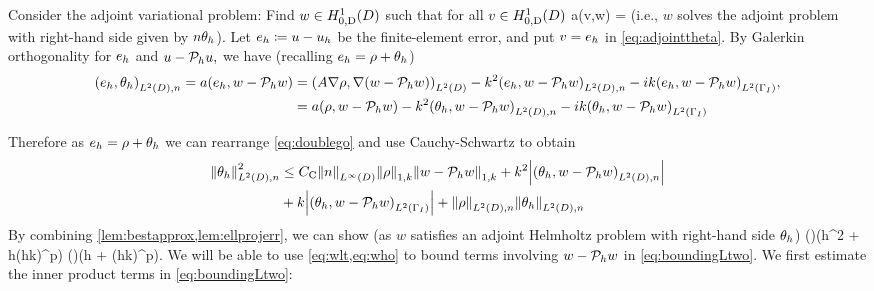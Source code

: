 Consider the adjoint variational problem: Find $w \in \HozDD$ such that for all $v \in \HozDD$
\beq\label{eq:adjointtheta}
a(v,w) = 
\eeq
(i.e., $w$ solves the adjoint problem with right-hand side given by $n\theta_{h}$). Let $e_{h} \coloneqq u -u_{h}$ be the finite-element error, and put $v = e_{h}$ in \cref{eq:adjointtheta}. By Galerkin orthogonality for $e_{h}$ and $u-\mathcal P_{h} u,$ we have (recalling $e_{h} = \rho + \theta_{h}$)
\begin{align}
\IPLtDn{\eh}{\thetah} = a(\eh,w-\Ph w) &= \IPLtD{A \grad \rho}{\grad(w-\Ph w)}  -k^2 \IPLtDn{\eh}{w-\Ph w} -ik \IPLtGI{\eh}{w-\Ph w},\nonumber\\
&=a(\rho,w-\Ph w) -k^2 \IPLtDn{\thetah}{w-\Ph w} -ik \IPLtGI{\thetah}{w-\Ph w}\label{eq:doublego}
\end{align}

Therefore as $e_{h} = \rho + \theta_{h}$ we can rearrange \cref{eq:doublego} and use Cauchy-Schwartz to obtain
\begin{align}
\NLtDn{\thetah}^2 &\leq \Cc\NLiD{n} \NW{\rho} \NW{w- \Ph w} + k^2 \abs{\IPLtDn{\thetah}{w- \Ph w}}\nonumber\\
&+ k \abs{\IPLtGI{\thetah}{w-\Ph w}} + \NLtDn{\rho}\NLtDn{\thetah}\label{eq:boundingLtwo}
\end{align}
By combining \cref{lem:bestapprox,lem:ellprojerr}, we can show (as $w$ satisfies an adjoint Helmholtz problem with right-hand side $\theta_{h}$)
\beq\label{eq:wlt}
 \leq {} \mleft(\mright)\mleft(\CFEMotilde h^2 + \CFEMttilde \CAnk h(hk)^p\mright)\NLtD{\thetah} \tand
\eeq
\beq\label{eq:who}
  \mleft(\mright)\mleft(\CFEMotilde h + \CFEMttilde \CAnk (hk)^p\mright)\NLtD{\thetah}.
\eeq
We will be able to use \cref{eq:wlt,eq:who} to bound terms involving $w - \mathcal P_{h} w$ in \cref{eq:boundingLtwo}. We first estimate the inner product terms in \cref{eq:boundingLtwo}:
